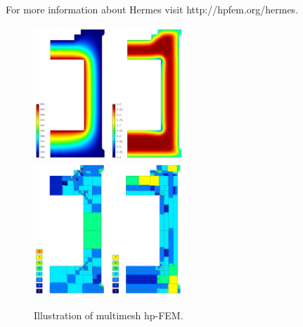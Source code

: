 \documentclass[12pt]{elsarticle}
\begin{document}
For more information about Hermes visit {http://hpfem.org/hermes}.

\begin{figure}[!ht]
\centering
\includegraphics[height=5cm]{img/hermes_hm_sol.png}
\hspace{10mm}
\includegraphics[height=5cm]{img/hermes_hm_mesh.png}
\caption{Illustration of multimesh hp-FEM.}
\label{fig:hermes_hm}
\end{figure}
\noindent






\end{document}
